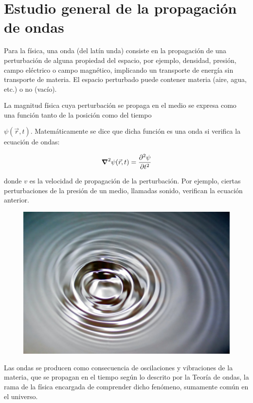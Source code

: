 \chapter{Estudio general de la propagación de ondas}

\begin{miparrafo}
Para la física, una onda (del latín unda) consiste en la propagación de una perturbación de alguna propiedad del espacio, por ejemplo, densidad, presión, campo eléctrico o campo magnético, implicando un transporte de energía sin transporte de materia. El espacio perturbado puede contener materia (aire, agua, etc.) o no (vacío).

La magnitud física cuya perturbación se propaga en el medio se expresa como una función tanto de la posición como del tiempo 

$\psi ({\vec  {r}},t)$. Matemáticamente se dice que dicha función es una onda si verifica la ecuación de ondas:

$$\displaystyle \grad^2 \psi (\vec r ,t)= \pdv[2]{\psi}{t}(\vec r ,t)$$

donde $v$ es la velocidad de propagación de la perturbación. Por ejemplo, ciertas perturbaciones de la presión de un medio, llamadas sonido, verifican la ecuación anterior.

\begin{figure}[H]
		\centering
		\includegraphics[width=1\textwidth]{imagenes/imagenes21/T21IM01.png}
	\end{figure}

Las ondas se producen como consecuencia de oscilaciones y vibraciones de la materia, que se propagan en el tiempo según lo descrito por la Teoría de ondas, la rama de la física encargada de comprender dicho fenómeno, sumamente común en el universo.


\end{miparrafo}
